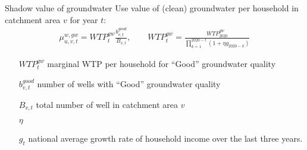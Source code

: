 \begin{frame}{Shadow value of groundwater}
  Use value of (clean) groundwater per household in catchment area $v$ for year $t$:
  \begin{align*}
    \mu_{u,v,t}^{w,gw}=WTP_{t}^{gw}\frac{b_{v,t}^{good}}{B_{v,t}},\quad\quad WTP_{t}^{gw}=\frac{WTP_{2020}^{gw}}{\prod_{k=1}^{2020-t}(1+\eta g_{2020-k})}
  \end{align*}
  \begin{itemize}
    \item[{\scriptsize$WTP_{t}^{gw}$}] marginal WTP per household for “Good” groundwater quality
    \item[$b_{v,t}^{good}$] number of wells with “Good” groundwater quality
    \item[$B_{v,t}$] total number of well in catchment area $v$
    \item[$\eta$] 
    \item[$g_{t}$] national average growth rate of household income over the last three years.
  \end{itemize}
\end{frame}